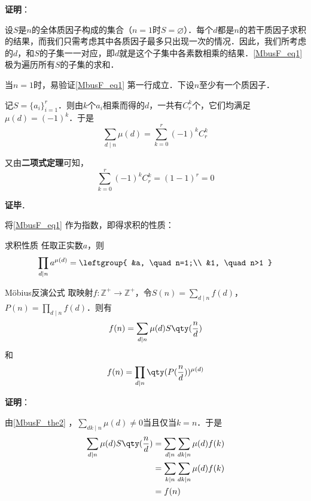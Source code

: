 \textbf{证明}：

设$S$是$n$的全体质因子构成的集合（$n=1$时$S=\varnothing$）．每个$d$都是$n$的若干质因子求积的结果，而我们只需考虑其中各质因子最多只出现一次的情况．因此，我们所考虑的$d$，和$S$的子集一一对应，即$d$就是这个子集中各素数相乘的结果．\autoref{MbusF_eq1} 极为遍历所有$S$的子集的求和．

当$n=1$时，易验证\autoref{MbusF_eq1} 第一行成立．下设$n$至少有一个质因子．

记$S=\{a_i\}_{i=1}^r$．则由$k$个$a_i$相乘而得的$d$，一共有$C^k_r$个，它们均满足$\mu(d)=(-1)^k$．于是
\begin{equation}
\sum_{d\mid n}\mu(d)=\sum_{k=0}^r(-1)^kC^k_r
\end{equation}

又由\textbf{二项式定理}可知，
\begin{equation}
\sum_{k=0}^r(-1)^kC^k_r=(1-1)^r=0
\end{equation}

\textbf{证毕}．




将\autoref{MbusF_eq1} 作为指数，即得求积的性质：


\begin{corollary}{求积性质}\label{MbusF_cor1}
任取正实数$a$，则
\begin{equation}
\prod_{d\mid n}a^{\mu(d)}=
\leftgroup{
    &a, \quad n=1;\\
    &1, \quad n>1
}
\end{equation}
\end{corollary}






\begin{theorem}{Möbius反演公式}\label{MbusF_the3}
取映射$f:\mathbb{Z}^+\to\mathbb{Z}^+$，令$S(n)=\sum_{d\mid n}f(d)$，$P(n)=\prod_{d\mid n}f(d)$．则有
\begin{equation}
f(n) = \sum_{d\mid n}\mu(d)S\qty(\frac{n}{d})
\end{equation}
和
\begin{equation}
f(n) = \prod_{d\mid n}\qty(P(\frac{n}{d}))^{\mu(d)}
\end{equation}
\end{theorem}

\textbf{证明}：

由\autoref{MbusF_the2} ，$\sum_{dk\mid n}\mu(d)\neq 0$当且仅当$k=n$．于是
\begin{equation}
\begin{aligned}
\sum_{d\mid n}\mu(d)S\qty(\frac{n}{d})&=\sum_{d\mid n}\sum_{dk\mid n}\mu(d)f(k)\\
&=\sum_{k\mid n}\sum_{dk\mid n}\mu(d)f(k)\\
&=f(n)
\end{aligned}
\end{equation}


